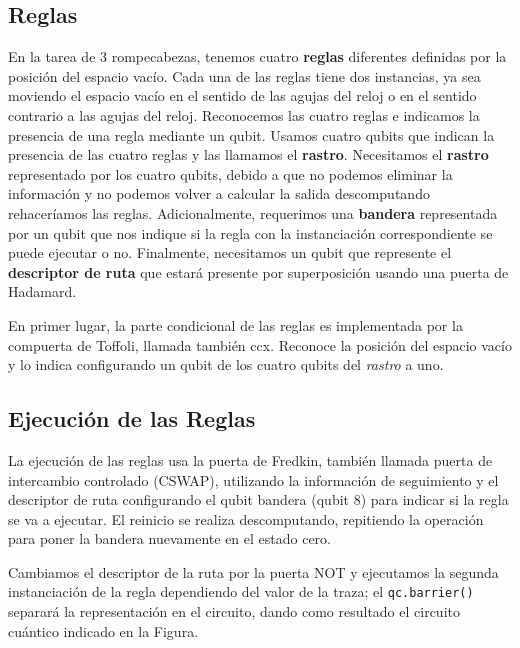\documentclass[11pt]{article}
\begin{document}
    \hypertarget{reglas}{%
\subsection{Reglas}\label{reglas}}

En la tarea de 3 rompecabezas, tenemos cuatro \textbf{reglas} diferentes
definidas por la posición del espacio vacío. Cada una de las reglas
tiene dos instancias, ya sea moviendo el espacio vacío en el sentido de
las agujas del reloj o en el sentido contrario a las agujas del reloj.
Reconocemos las cuatro reglas e indicamos la presencia de una regla
mediante un qubit. Usamos cuatro qubits que indican la presencia de las
cuatro reglas y las llamamos el \textbf{rastro}. Necesitamos el
\textbf{rastro} representado por los cuatro qubits, debido a que no
podemos eliminar la información y no podemos volver a calcular la salida
descomputando rehaceríamos las reglas. Adicionalmente, requerimos una
\textbf{bandera} representada por un qubit que nos indique si la regla
con la instanciación correspondiente se puede ejecutar o no. Finalmente,
necesitamos un qubit que represente el \textbf{descriptor de ruta} que
estará presente por superposición usando una puerta de Hadamard.

En primer lugar, la parte condicional de las reglas es implementada por
la compuerta de Toffoli, llamada también ccx. Reconoce la posición del
espacio vacío y lo indica configurando un qubit de los cuatro qubits del
\emph{rastro} a uno.

    \hypertarget{ejecuciuxf3n-de-las-reglas}{%
\subsection{Ejecución de las
Reglas}\label{ejecuciuxf3n-de-las-reglas}}

La ejecución de las reglas usa la puerta de Fredkin, también llamada
puerta de intercambio controlado (CSWAP), utilizando la información de
seguimiento y el descriptor de ruta configurando el qubit bandera (qubit
8) para indicar si la regla se va a ejecutar. El reinicio se realiza
descomputando, repitiendo la operación para poner la bandera nuevamente
en el estado cero.

Cambiamos el descriptor de la ruta por la puerta NOT y ejecutamos la
segunda instanciación de la regla dependiendo del valor de la traza; el
\texttt{qc.barrier()} separará la representación en el circuito, dando
como resultado el circuito cuántico indicado en la Figura.
\end{document}
